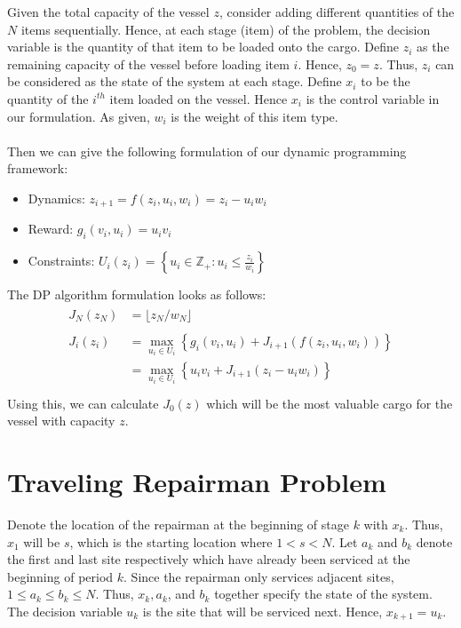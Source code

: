 \documentclass[11pt, oneside]{article}   	%
\begin{document}
Given the total capacity of the vessel $z$, consider adding different quantities of the $N$ items sequentially. Hence, at each stage (item) of the problem, the decision variable is the quantity of that item to be loaded onto the cargo. Define $z_i$ as the remaining capacity of the vessel before loading item $i$. Hence, $z_0 = z$. Thus, $z_i$ can be considered as the state of the system at each stage. Define $x_i$ to be the quantity of the $i^{th}$ item loaded on the vessel. Hence $x_i$ is the control variable in our formulation. As given, $w_i$ is the weight of this item type.\\\\
Then we can give the following formulation of our dynamic programming framework:
\begin{itemize}
\item Dynamics: $z_{i+1} = f(z_i,u_i,w_i) = z_i - u_i w_i$
\item Reward: $g_i(v_i, u_i) = u_i v_i$
\item Constraints: $U_i(z_i) = \left\{ u_i \in \mathbb{Z}_+ : u_i \leq \frac{z_i}{w_i} \right\}$
\end{itemize}
The DP algorithm formulation looks as follows:
\begin{align}
\begin{split}
J_{N}(z_{N}) &= \lfloor{z_N/w_N}\rfloor
\\\\
J_i(z_i) &= \max_{u_i \in U_i} \left\{ g_i(v_i, u_i) + J_{i+1}(f(z_i, u_i, w_i)) \right\}\\
&= \max_{u_i \in U_i} \left\{ u_i v_i + J_{i+1}(z_i - u_i w_i) \right\}\\
\end{split}
\end{align}
Using this, we can calculate $J_0(z)$ which will be the most valuable cargo for the vessel with capacity $z$.


\section{Traveling Repairman Problem}

Denote the location of the repairman at the beginning of stage $k$ with $x_k$. Thus, $x_1$ will be $s$, which is the starting location where $1 < s < N$. Let $a_k$ and $b_k$ denote the first and last site respectively which have already been serviced at the beginning of period $k$. Since the repairman only services adjacent sites, $1 \leq a_k \leq b_k \leq N$. Thus, $x_k, a_k$, and $b_k$ together specify the state of the system. The decision variable $u_k$ is the site that will be serviced next. Hence, $x_{k+1} = u_k$.
\end{document}
